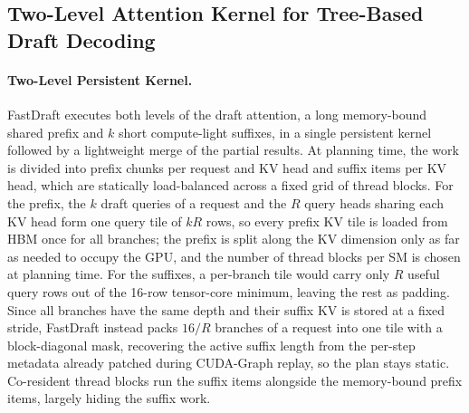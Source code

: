 \documentclass{article}
\begin{document}
\subsection{Two-Level Attention Kernel for Tree-Based Draft Decoding}
\label{sec:kernel}

\paragraph{Two-Level Persistent Kernel.}
FastDraft executes both levels of the draft attention, a long memory-bound shared prefix and $k$ short compute-light suffixes, in a single persistent kernel followed by a lightweight merge of the partial results. At planning time, the work is divided into prefix chunks per request and KV head and suffix items per KV head, which are statically load-balanced across a fixed grid of thread blocks. For the prefix, the $k$ draft queries of a request and the $R$ query heads sharing each KV head form one query tile of $kR$ rows, so every prefix KV tile is loaded from HBM once for all branches; the prefix is split along the KV dimension only as far as needed to occupy the GPU, and the number of thread blocks per SM is chosen at planning time. For the suffixes, a per-branch tile would carry only $R$ useful query rows out of the 16-row tensor-core minimum, leaving the rest as padding. Since all branches have the same depth and their suffix KV is stored at a fixed stride, FastDraft instead packs $16/R$ branches of a request into one tile with a block-diagonal mask, recovering the active suffix length from the per-step metadata already patched during CUDA-Graph replay, so the plan stays static. Co-resident thread blocks run the suffix items alongside the memory-bound prefix items, largely hiding the suffix work.
\end{document}
